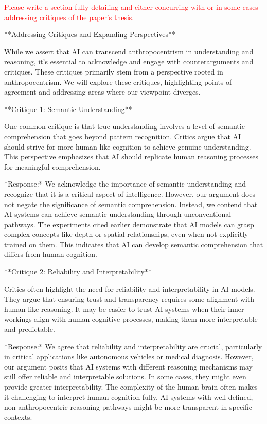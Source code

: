 \documentclass{article}
\begin{document}
\textcolor{red}{Please write a section fully detailing and either concurring with or in some cases addressing critiques of the paper's thesis.}

**Addressing Critiques and Expanding Perspectives**

While we assert that AI can transcend anthropocentrism in understanding and reasoning, it's essential to acknowledge and engage with counterarguments and critiques. These critiques primarily stem from a perspective rooted in anthropocentrism. We will explore these critiques, highlighting points of agreement and addressing areas where our viewpoint diverges.

**Critique 1: Semantic Understanding**

One common critique is that true understanding involves a level of semantic comprehension that goes beyond pattern recognition. Critics argue that AI should strive for more human-like cognition to achieve genuine understanding. This perspective emphasizes that AI should replicate human reasoning processes for meaningful comprehension.

*Response:* We acknowledge the importance of semantic understanding and recognize that it is a critical aspect of intelligence. However, our argument does not negate the significance of semantic comprehension. Instead, we contend that AI systems can achieve semantic understanding through unconventional pathways. The experiments cited earlier demonstrate that AI models can grasp complex concepts like depth or spatial relationships, even when not explicitly trained on them. This indicates that AI can develop semantic comprehension that differs from human cognition.

**Critique 2: Reliability and Interpretability**

Critics often highlight the need for reliability and interpretability in AI models. They argue that ensuring trust and transparency requires some alignment with human-like reasoning. It may be easier to trust AI systems when their inner workings align with human cognitive processes, making them more interpretable and predictable.

*Response:* We agree that reliability and interpretability are crucial, particularly in critical applications like autonomous vehicles or medical diagnosis. However, our argument posits that AI systems with different reasoning mechanisms may still offer reliable and interpretable solutions. In some cases, they might even provide greater interpretability. The complexity of the human brain often makes it challenging to interpret human cognition fully. AI systems with well-defined, non-anthropocentric reasoning pathways might be more transparent in specific contexts.
\end{document}
